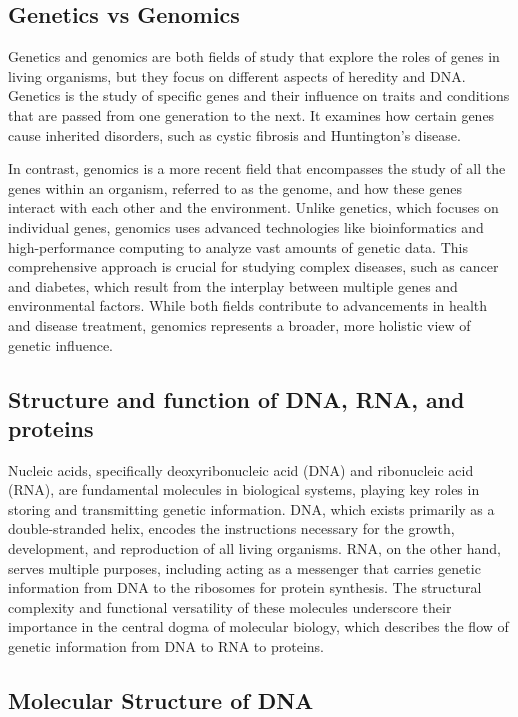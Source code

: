 \subsection{Genetics vs Genomics}

Genetics and genomics are both fields of study that explore the roles of genes in living organisms, but they focus on different aspects of heredity and DNA. Genetics is the study of specific genes and their influence on traits and conditions that are passed from one generation to the next. It examines how certain genes cause inherited disorders, such as cystic fibrosis and Huntington's disease. \cite{NHGRI2018}

In contrast, genomics is a more recent field that encompasses the study of all the genes within an organism, referred to as the genome, and how these genes interact with each other and the environment. Unlike genetics, which focuses on individual genes, genomics uses advanced technologies like bioinformatics and high-performance computing to analyze vast amounts of genetic data. This comprehensive approach is crucial for studying complex diseases, such as cancer and diabetes, which result from the interplay between multiple genes and environmental factors. While both fields contribute to advancements in health and disease treatment, genomics represents a broader, more holistic view of genetic influence. \cite{JAX2017}

\subsection{Structure and function of DNA, RNA, and proteins}

Nucleic acids, specifically deoxyribonucleic acid (DNA) and ribonucleic acid (RNA), are fundamental molecules in biological systems, playing key roles in storing and transmitting genetic information. DNA, which exists primarily as a double-stranded helix, encodes the instructions necessary for the growth, development, and reproduction of all living organisms. RNA, on the other hand, serves multiple purposes, including acting as a messenger that carries genetic information from DNA to the ribosomes for protein synthesis. The structural complexity and functional versatility of these molecules underscore their importance in the central dogma of molecular biology, which describes the flow of genetic information from DNA to RNA to proteins. \cite{Minchin2019}

\subsection{Molecular Structure of DNA}

